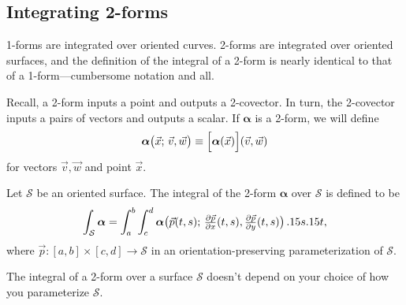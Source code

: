 \subsection{Integrating 2-forms}

1-forms are integrated over oriented curves.  2-forms are integrated over oriented
surfaces, and the definition of the integral of a 2-form
is nearly identical to that of a 1-form---cumbersome notation and all.

Recall, a 2-form inputs a point and outputs a 2-covector.
In turn, the 2-covector inputs a pairs of vectors and outputs a scalar.  If
$\bm \alpha$ is a 2-form, we will define
\[
	\bm\alpha\big(\vec x;\, \vec v,\vec w\big)\equiv
	\Big[\bm\alpha(\vec x)\Big](\vec v,\vec w)
\]
for vectors $\vec v,\vec w$ and point $\vec x$.

\begin{definition}
	Let $\mathcal S$ be an oriented surface. The integral of
	the 2-form $\bm\alpha$ over $\mathcal S$ is defined to be
	\[
		\int_{\mathcal S} \bm\alpha 
		=\int_a^b\int _c^d \bm\alpha
		\big(\vec p(t,s);\, \tfrac{\partial \vec p}{\partial x}(t,s),
		\tfrac{\partial\vec p}{\partial y}(t,s)\big)\,.15 s .15 t,
	\]
	where $\vec p:[a,b]\times [c,d]\to\mathcal S$ in an 
	orientation-preserving parameterization of $\mathcal S$.
\end{definition}

The integral of a 2-form over a surface $\mathcal S$
doesn't depend on your choice of how you parameterize $\mathcal S$.

